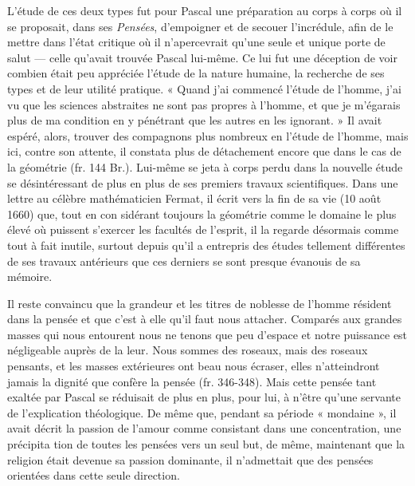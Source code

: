 \documentclass[12pt,a4paper]{article}
\newcommand{\opage}[1]{\marginnote{\footnotesize\textit{[#1]}}}
\begin{document}
L'étude de ces deux types fut pour Pascal une préparation au
corps à corps où il se proposait, dans ses \emph{Pensées}, d'empoigner et
de secouer l'incrédule, afin de le mettre dans l'état critique où il
n'apercevrait qu'une seule et unique porte de salut --- celle qu'avait
trouvée Pascal lui-même. Ce lui fut une déception de voir combien
était peu appréciée l'étude de la nature humaine, la recherche de
ses types et de leur utilité pratique. « Quand j'ai commencé l'étude
de l'homme, j'ai vu que les sciences abstraites ne sont pas propres
à l'homme, et que je m'égarais plus de ma condition en y pénétrant
que les autres en les ignorant. » Il avait espéré, alors, trouver des
compagnons plus nombreux en l'étude de l'homme, mais ici, contre
son attente, il constata plus de détachement encore que dans le cas
de la géométrie (fr. 144 Br.). Lui-même se jeta à corps perdu dans
la nouvelle étude se désintéressant de plus en plus de ses premiers
travaux scientifiques. Dans une lettre au célèbre mathématicien
Fermat, il écrit vers la fin de sa vie (10 août 1660) que, tout en con\-%
\opage{232}sidérant toujours la géométrie comme le domaine le plus élevé où
puissent s'exercer les facultés de l'esprit, il la regarde désormais
comme tout à fait inutile, surtout depuis qu'il a entrepris des études
tellement différentes de ses travaux antérieurs que ces derniers se
sont presque évanouis de sa mémoire.

Il reste convaincu que la grandeur et les titres de noblesse de
l'homme résident dans la pensée et que c'est à elle qu'il faut nous attacher.
Comparés aux grandes masses qui nous entourent nous
ne tenons que peu d'espace et notre puissance est négligeable auprès
de la leur. Nous sommes des roseaux, mais des roseaux pensants,
et les masses extérieures ont beau nous écraser, elles n'atteindront
jamais la dignité que confère la pensée (fr. 346-348). Mais cette
pensée tant exaltée par Pascal se réduisait de plus en plus, pour
lui, à n'être qu'une servante de l'explication théologique. De même
que, pendant sa période « mondaine », il avait décrit la passion de
l'amour comme consistant dans une concentration, une précipita\-%
tion de toutes les pensées vers un seul but, de même, maintenant
que la religion était devenue sa passion dominante, il n'admettait
que des pensées orientées dans cette seule direction.
\end{document}
